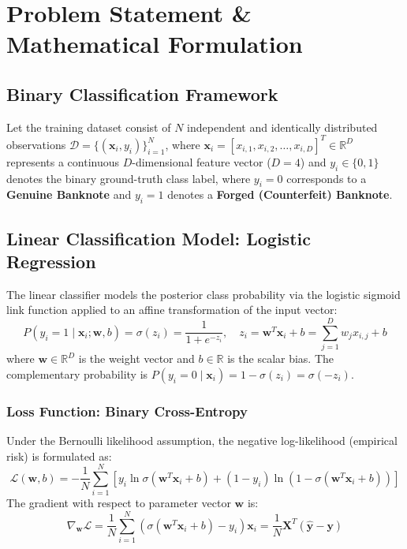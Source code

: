 \documentclass[12pt,a4paper]{article}
\begin{document}
\section{Problem Statement \& Mathematical Formulation}

\subsection{Binary Classification Framework}
Let the training dataset consist of $N$ independent and identically distributed observations $\mathcal{D} = \{(\mathbf{x}_i, y_i)\}_{i=1}^N$, where $\mathbf{x}_i = [x_{i,1}, x_{i,2}, \dots, x_{i,D}]^T \in \mathbb{R}^D$ represents a continuous $D$-dimensional feature vector ($D=4$) and $y_i \in \{0, 1\}$ denotes the binary ground-truth class label, where $y_i = 0$ corresponds to a \textbf{Genuine Banknote} and $y_i = 1$ denotes a \textbf{Forged (Counterfeit) Banknote}.

\subsection{Linear Classification Model: Logistic Regression}
The linear classifier models the posterior class probability via the logistic sigmoid link function applied to an affine transformation of the input vector:
\begin{equation}
P(y_i = 1 \mid \mathbf{x}_i; \mathbf{w}, b) = \sigma(z_i) = \frac{1}{1 + e^{-z_i}}, \quad z_i = \mathbf{w}^T \mathbf{x}_i + b = \sum_{j=1}^D w_j x_{i,j} + b
\end{equation}
where $\mathbf{w} \in \mathbb{R}^D$ is the weight vector and $b \in \mathbb{R}$ is the scalar bias. The complementary probability is $P(y_i = 0 \mid \mathbf{x}_i) = 1 - \sigma(z_i) = \sigma(-z_i)$.

\subsubsection{Loss Function: Binary Cross-Entropy}
Under the Bernoulli likelihood assumption, the negative log-likelihood (empirical risk) is formulated as:
\begin{equation}
\mathcal{L}(\mathbf{w}, b) = -\frac{1}{N} \sum_{i=1}^N \left[ y_i \ln \sigma(\mathbf{w}^T \mathbf{x}_i + b) + (1 - y_i) \ln(1 - \sigma(\mathbf{w}^T \mathbf{x}_i + b)) \right]
\end{equation}
The gradient with respect to parameter vector $\mathbf{w}$ is:
\begin{equation}
\nabla_{\mathbf{w}} \mathcal{L} = \frac{1}{N} \sum_{i=1}^N (\sigma(\mathbf{w}^T \mathbf{x}_i + b) - y_i) \mathbf{x}_i = \frac{1}{N} \mathbf{X}^T (\hat{\mathbf{y}} - \mathbf{y})
\end{equation}
\end{document}
